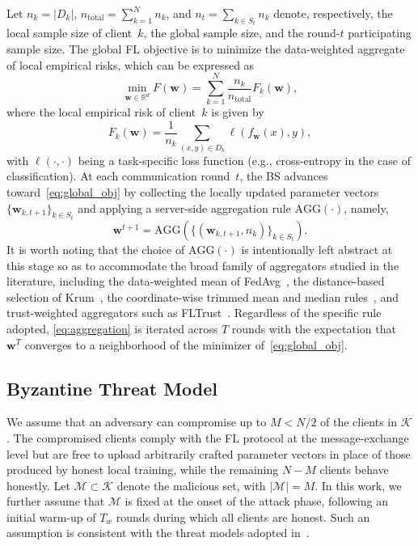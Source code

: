 \documentclass[journal]{IEEEtran}
\begin{document}
Let $n_k = |D_k|$, $n_{\text{total}} = \sum_{k=1}^{N} n_k$, and $n_t = \sum_{k \in S_t} n_k$ denote, respectively, the local sample size of client~$k$, the global sample size, and the round-$t$ participating sample size. The global FL objective is to minimize the data-weighted aggregate of local empirical risks, which can be expressed as
\begin{equation}
\min_{\mathbf{w} \in \mathbb{R}^d} F(\mathbf{w}) = \sum_{k=1}^{N} \frac{n_k}{n_{\text{total}}} F_k(\mathbf{w}),
\label{eq:global_obj}
\end{equation}
where the local empirical risk of client~$k$ is given by
\begin{equation}
F_k(\mathbf{w}) = \frac{1}{n_k} \sum_{(x,y) \in D_k} \ell(f_{\mathbf{w}}(x), y),
\label{eq:local_risk}
\end{equation}
with $\ell(\cdot, \cdot)$ being a task-specific loss function (e.g., cross-entropy in the case of classification). At each communication round~$t$, the BS advances toward~\eqref{eq:global_obj} by collecting the locally updated parameter vectors $\{\mathbf{w}_{k,t+1}\}_{k \in S_t}$ and applying a server-side aggregation rule $\text{AGG}(\cdot)$, namely,
\begin{equation}
\mathbf{w}^{t+1} = \text{AGG}\left(\{(\mathbf{w}_{k,t+1}, n_k)\}_{k \in S_t}\right).
\label{eq:aggregation}
\end{equation}
It is worth noting that the choice of $\text{AGG}(\cdot)$ is intentionally left abstract at this stage so as to accommodate the broad family of aggregators studied in the literature, including the data-weighted mean of FedAvg~\cite{mcmahan2017communication}, the distance-based selection of Krum~\cite{blanchard2017machine}, the coordinate-wise trimmed mean and median rules~\cite{yin2018byzantine}, and trust-weighted aggregators such as FLTrust~\cite{cao2020fltrust}. Regardless of the specific rule adopted, \eqref{eq:aggregation} is iterated across $T$ rounds with the expectation that $\mathbf{w}^T$ converges to a neighborhood of the minimizer of~\eqref{eq:global_obj}.

\subsection{Byzantine Threat Model}

We assume that an adversary can compromise up to $M < N/2$ of the clients in $\mathcal{K}$. The compromised clients comply with the FL protocol at the message-exchange level but are free to upload arbitrarily crafted parameter vectors in place of those produced by honest local training, while the remaining $N - M$ clients behave honestly. Let $\mathcal{M} \subset \mathcal{K}$ denote the malicious set, with $|\mathcal{M}| = M$. In this work, we further assume that $\mathcal{M}$ is fixed at the onset of the attack phase, following an initial warm-up of $T_w$ rounds during which all clients are honest. Such an assumption is consistent with the threat models adopted in~\cite{baruch2019little, shejwalkar2021manipulating}.
\end{document}

